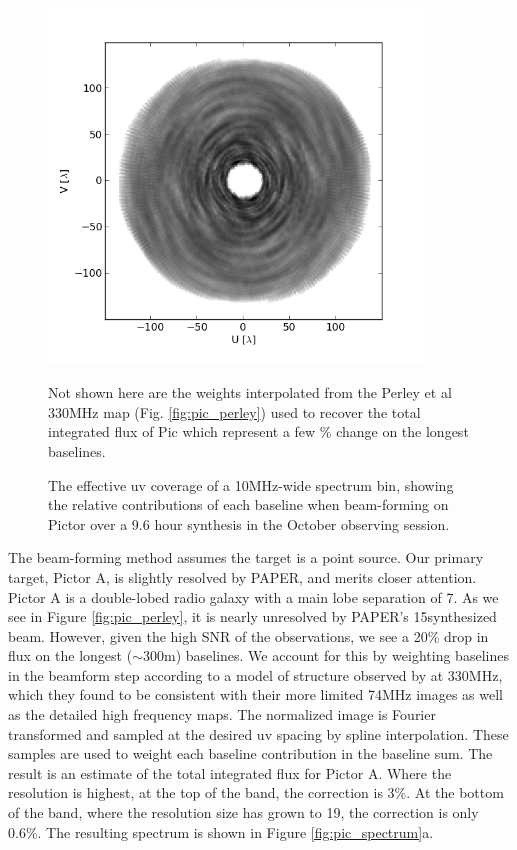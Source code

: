 \documentclass[preprint]{aastex}
\begin{document}
\begin{figure}
\includegraphics[width=0.9\textwidth]{plots/PicA_Oct2011_uv_coverage.png}
\caption{The effective uv coverage of a 10MHz-wide spectrum bin, showing the relative contributions of each baseline when beam-forming on Pictor over a 9.6 hour synthesis in the October observing session. \label{fig:uv_coverage}}
Not shown here are the weights interpolated from the Perley et al 330MHz map (Fig. \ref{fig:pic_perley}) used to recover the total integrated flux of Pic  which represent a few \% change on the longest baselines.
\end{figure}

The beam-forming method assumes the target is a point source. Our primary
target, Pictor A, is slightly resolved by PAPER, and merits closer attention.
Pictor A is a double-lobed radio galaxy with a main lobe separation of
7\arcmin. As we see in Figure \ref{fig:pic_perley}, it is nearly unresolved by
PAPER's 15\arcmin synthesized beam. However, given the high SNR of the
observations, we see a 20\% drop in flux on the longest ($\sim$300m) baselines. 
We account for this by weighting baselines
in the beamform step according to a model of structure observed by
\citet{Perley:1997p9312} at 330MHz, which they found to be consistent with
their more limited 74MHz images as well as the detailed high frequency maps.
The normalized image is Fourier transformed and sampled at the desired uv
spacing by spline interpolation. These samples are used to weight each baseline
contribution in the baseline sum. The result is an estimate of the total
integrated flux for Pictor A. Where the resolution is highest, at the top of
the band, the correction is 3\%. At the bottom of the band, where the
resolution size has grown to 19\arcmin, the correction is only 0.6\%. The
resulting spectrum is shown in Figure \ref{fig:pic_spectrum}a.
\end{document}

